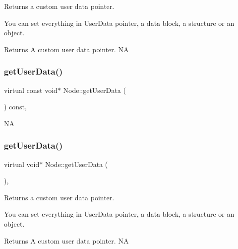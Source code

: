 Returns a custom user data pointer.

You can set everything in User\+Data pointer, a data block, a structure or an object.

\begin{DoxyReturn}{Returns}
A custom user data pointer.  NA 
\end{DoxyReturn}
\mbox{\label{classNode_a8f7eb64c4811677bc4ea83562981caf6}} 
\subsubsection{\texorpdfstring{get\+User\+Data()}{getUserData()}\hspace{0.1cm}{\footnotesize\ttfamily [2/4]}}
{\footnotesize\ttfamily virtual const void$\ast$ Node\+::get\+User\+Data (\begin{DoxyParamCaption}{ }\end{DoxyParamCaption}) const\hspace{0.3cm}{\ttfamily [inline]}, {\ttfamily [virtual]}}

NA \mbox{\label{classNode_afeacb9cc8c8730d3ee8359ef42d5318d}} 
\subsubsection{\texorpdfstring{get\+User\+Data()}{getUserData()}\hspace{0.1cm}{\footnotesize\ttfamily [3/4]}}
{\footnotesize\ttfamily virtual void$\ast$ Node\+::get\+User\+Data (\begin{DoxyParamCaption}{ }\end{DoxyParamCaption})\hspace{0.3cm}{\ttfamily [inline]}, {\ttfamily [virtual]}}

Returns a custom user data pointer.

You can set everything in User\+Data pointer, a data block, a structure or an object.

\begin{DoxyReturn}{Returns}
A custom user data pointer.  NA 
\end{DoxyReturn}
\mbox{\label{classNode_a8f7eb64c4811677bc4ea83562981caf6}} 
